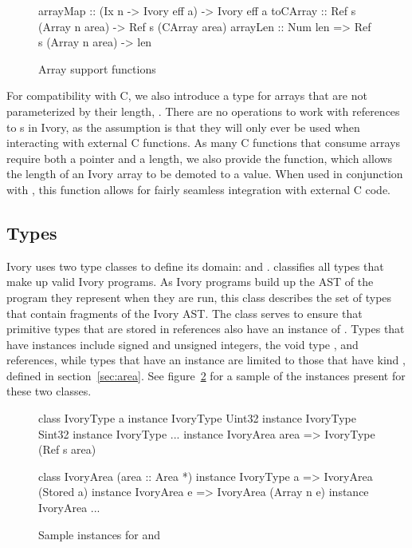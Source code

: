 \begin{figure}[h]
\begin{code}
arrayMap :: (Ix n -> Ivory eff a) -> Ivory eff a
toCArray :: Ref s (Array n area) -> Ref s (CArray area)
arrayLen :: Num len => Ref s (Array n area) -> len
\end{code}
\caption{Array support functions}
\label{array-support-functions}
\end{figure}

For compatibility with C, we also introduce a type for arrays that are not
parameterized by their length, .  There are no operations to work
with references to s in Ivory, as the assumption is that they will
only ever be used when interacting with external C functions.  As many C
functions that consume arrays require both a pointer and a length, we also
provide the  function, which allows the length of an Ivory array to
be demoted to a value.  When used in conjunction with , this
function allows for fairly seamless integration with external C code.

\subsection{Types}
\label{sec:types}

Ivory uses two type classes to define its domain:  and
.   classifies all types that make up valid Ivory
programs.  As Ivory programs build up the AST of the program they represent when
they are run, this class describes the set of types that contain fragments of
the Ivory AST.  The  class serves to ensure that primitive types
that are stored in references also have an instance of .  Types
that have  instances include signed and unsigned integers, the
void type \cd{()}, and references, while types that have an 
instance are limited to those that have kind , defined in
section~\ref{sec:area}.  See figure~\ref{fig:types} for a sample of the
instances present for these two classes.

\begin{figure}
\begin{code}
class IvoryType a
instance IvoryType Uint32
instance IvoryType Sint32
instance IvoryType ...
instance IvoryArea area => IvoryType (Ref s area)

class IvoryArea (area :: Area *)
instance IvoryType a => IvoryArea (Stored a)
instance IvoryArea e => IvoryArea (Array n e)
instance IvoryArea ...
\end{code}
\caption{Sample instances for  and }
\label{fig:types}
\end{figure}

